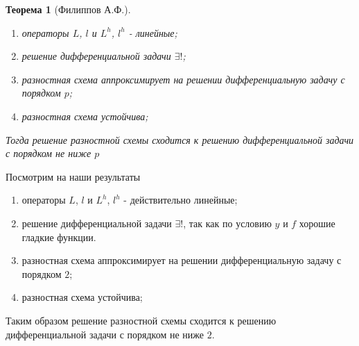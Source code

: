 \documentclass[12pt]{article}
\newtheorem*{theorem}{Теорема}
\begin{document}
\begin{enumerate}[I.]
\begin{theorem}[Филиппов А.Ф.]
\begin{enumerate}
                \item операторы $L$, $l$ и $L^h$, $l^h$ - линейные;
                \item решение дифференциальной задачи $\exists!$;
                \item разностная схема аппроксимирует на решении дифференциальную задачу с порядком $p$;
                \item разностная схема устойчива;
            \end{enumerate}
            Тогда решение разностной схемы сходится к решению дифференциальной задачи с порядком не ниже $p$
        \end{theorem}
        Посмотрим на наши результаты
        \begin{enumerate}
            \item операторы $L$, $l$ и $L^h$, $l^h$ - действительно линейные;
            \item решение дифференциальной задачи $\exists!$, так как по условию $y$ и $f$ хорошие гладкие функции.
            \item разностная схема аппроксимирует на решении дифференциальную задачу с порядком $2$;
            \item разностная схема устойчива;
        \end{enumerate}
        Таким образом решение разностной схемы сходится к решению дифференциальной задачи с порядком не ниже $2$.
    \end{enumerate}
\end{document}
